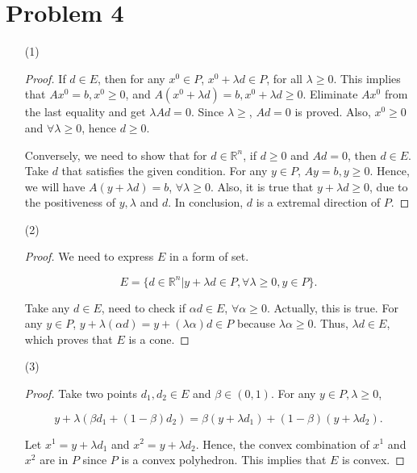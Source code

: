\documentclass[12pt]{article}
\begin{document}
\section*{Problem 4}

\begin{enumerate}
\item[(1)]
\begin{proof}

If $d\in E$, then for any $x^0 \in P$, $x^0+\lambda d \in P$, for all $\lambda \geqslant 0$. This implies that $Ax^0 = b, x^0 \geqslant 0$, and $A(x^0 + \lambda d) = b, x^0 + \lambda d \geqslant 0$. Eliminate $Ax^0$ from the last equality and get $\lambda Ad = 0$. Since $\lambda \geqslant$, $Ad = 0$ is proved.
Also, $x^0 \geqslant 0$ and $\forall \lambda \geqslant 0$, hence $d \geqslant 0$.

Conversely, we need to show that for $d\in\mathbb R^n$, if $d \geqslant 0$ and $Ad = 0$, then $d\in E$. Take $d$ that satisfies the given condition. For any $y \in P$, $Ay = b, y \geqslant 0$. Hence, we will have $A(y + \lambda d) = b$, $\forall \lambda \geqslant 0$. Also, it is true that $y + \lambda d \geqslant 0$, due to the positiveness of $y, \lambda$ and $d$. In conclusion, $d$ is a extremal direction of $P$.
\end{proof}

\item[(2)]

\begin{proof}

We need to express $E$ in a form of set.

$$
E = \{d \in \mathbb{R}^n | y + \lambda d \in P, \forall \lambda \geqslant 0, y\in P \}.
$$

Take any $d \in E$, need to check if $\alpha d\in E$, $\forall \alpha \geqslant 0$. Actually, this is true. For any $y\in P$, $y + \lambda (\alpha d) = y + (\lambda\alpha)d \in P$ because $\lambda\alpha \geqslant 0$. Thus, $\lambda d\in E$, which proves that $E$ is a cone.

\end{proof}

\item[(3)]

\begin{proof}

Take two points $d_1, d_2 \in E$ and $\beta \in (0, 1)$. For any $y\in P, \lambda \geqslant 0$, 

$$
y + \lambda(\beta d_1 + (1-\beta)d_2) = \beta(y+\lambda d_1) + (1-\beta)(y + \lambda d_2).
$$

Let $x^1 = y + \lambda d_1$ and $x^2 = y + \lambda d_2$. Hence, the convex combination of $x^1$ and $x^2$ are in $P$ since $P$ is a convex polyhedron. This implies that $E$ is convex.

\end{proof}

\end{enumerate}
\end{document}
